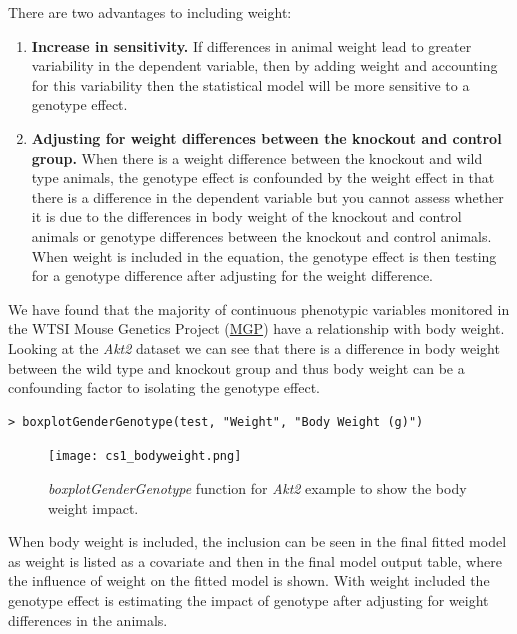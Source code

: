 \documentclass[12pt,a4paper]{article}
\begin{document}
There are two advantages to including weight:
\begin{enumerate}
 \item \textbf{Increase in sensitivity.}  
If differences in animal weight lead to greater variability in the dependent variable, then by adding weight and accounting for this variability then the statistical model will be more sensitive to a genotype effect. 

 \item \textbf{Adjusting for weight differences between the knockout and control group.}  
When there is a weight difference between the knockout and wild type animals, the genotype effect is confounded by the weight effect in that there is a difference in the dependent variable but you cannot assess whether it is due to the differences in body weight of the knockout and control animals or genotype differences between the knockout and control animals. When weight is included in the equation, the genotype effect is then testing for a genotype difference after adjusting for the weight difference.

\end{enumerate}

We have found that the majority of continuous phenotypic variables monitored in the WTSI Mouse Genetics Project (\href{http://www.sanger.ac.uk/resources/mouse/}{MGP}) have a relationship with body weight. 
Looking at the \textit{Akt2} dataset we can see that there is a difference in body weight between the wild type and knockout group and thus body weight can be a confounding factor to isolating the genotype effect.   

\begingroup
    \fontsize{8pt}{12pt}\selectfont
\begin{verbatim}
> boxplotGenderGenotype(test, "Weight", "Body Weight (g)")
\end{verbatim}
\endgroup 

\begin{figure}[H]%
\centerline{\texttt{[image: cs1\_bodyweight.png]}}
\caption{\textit{boxplotGenderGenotype} function for \textit{Akt2} example to show the body weight impact.}\label{fig:22}
\end{figure}

When body weight is included, the inclusion can be seen in the final fitted model as weight is listed as a covariate and then in the final model output table, where the influence of weight on the fitted model is shown.  
With weight included the genotype effect is estimating the impact of genotype after adjusting for weight differences in the animals. 
\end{document}
